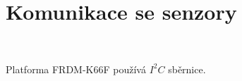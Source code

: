 \chapter{Komunikace se senzory}
\label{sec:SensorsCommunication}
\vspace{-20pt}
\

Platforma FRDM-K66F používá $I^2C$ sběrnice.

\endinput
